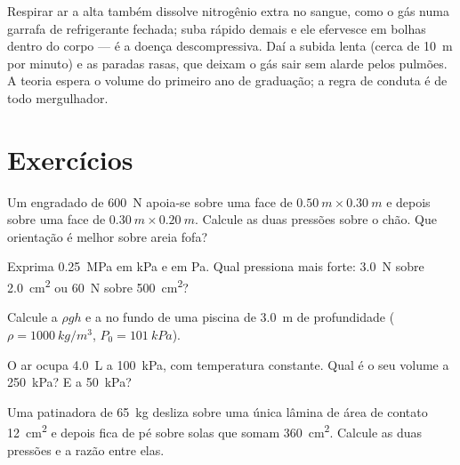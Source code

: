 \begin{remark}[Descompressão]\label{rem:g10:pressure:deco}
Respirar ar a alta  também dissolve nitrogênio extra no sangue,
como o gás numa garrafa de refrigerante fechada; suba rápido demais e ele
efervesce em bolhas dentro do corpo --- é a doença descompressiva. Daí a
subida lenta (cerca de \qty{10}{m} por minuto) e as paradas rasas, que
deixam o gás sair sem alarde pelos pulmões. A teoria espera o volume do
primeiro ano de graduação; a regra de conduta é de todo mergulhador.
\end{remark}

\section{Exercícios}

\begin{exercise}[$\star$]\label{exo:g10:pressure:1}
Um engradado de \qty{600}{N} apoia-se sobre uma face de
$\qty{0.50}{m} \times \qty{0.30}{m}$ e depois sobre uma face de
$\qty{0.30}{m} \times \qty{0.20}{m}$. Calcule as duas pressões sobre o
chão. Que orientação é melhor sobre areia fofa?
\end{exercise}

\begin{exercise}[$\star$]\label{exo:g10:pressure:2}
Exprima \qty{0.25}{MPa} em \unit{kPa} e em \unit{Pa}. Qual pressiona mais
forte: \qty{3.0}{N} sobre \qty{2.0}{cm^2} ou \qty{60}{N} sobre
\qty{500}{cm^2}?
\end{exercise}

\begin{exercise}[$\star$]\label{exo:g10:pressure:3}
Calcule a  $\rho g h$ e a  no fundo de
uma piscina de \qty{3.0}{m} de profundidade
($\rho = \qty{1000}{kg/m^3}$, $P_0 = \qty{101}{kPa}$).
\end{exercise}

\begin{exercise}[$\star$]\label{exo:g10:pressure:4}
O ar ocupa \qty{4.0}{L} a \qty{100}{kPa}, com temperatura constante. Qual
é o seu volume a \qty{250}{kPa}? E a \qty{50}{kPa}?
\end{exercise}

\begin{exercise}[$\star$]\label{exo:g10:pressure:5}
Uma patinadora de \qty{65}{kg} desliza sobre uma única lâmina de área de
contato \qty{12}{cm^2} e depois fica de pé sobre solas que somam
\qty{360}{cm^2}. Calcule as duas pressões e a razão entre elas.
\end{exercise}

